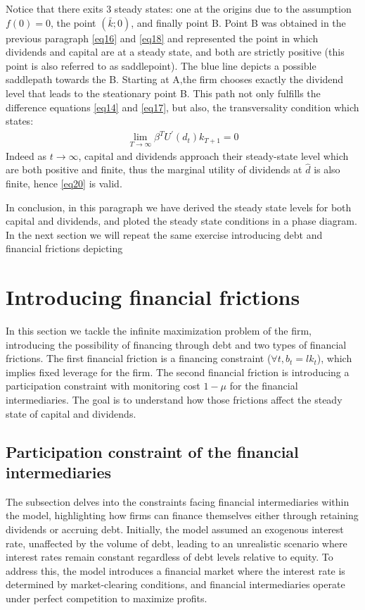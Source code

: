 \documentclass[12pt]{article}
\begin{document}
Notice that there exits 3 steady states: one at the origins due to the assumption \(f(0)=0\), the point \((\bar{k};0)\),
and finally point B. Point B was obtained in the previous paragraph \ref{eq16} and \ref{eq18} and represented the point in
which dividends and capital are at a steady state, and both are strictly positive (this point is also referred to as saddlepoint).
The blue line depicts a possible saddlepath towards the B. Starting at A,the firm chooses exactly the dividend level that
leads to the steationary point B. This path not only fulfills the difference equations \ref{eq14} and \ref{eq17}, but
also, the transversality condition which states:
\begin{align}
    \lim _{T \rightarrow \infty} \beta^T U^{\prime}\left(d_{t}\right) k_{T+1}=0  \label{eq20}
\end{align}
Indeed as \(t \rightarrow \infty\), capital and dividends approach their steady-state level which are both positive and
finite, thus the marginal utility of dividends at \(\hat{d}\) is also finite, hence \ref{eq20} is valid.

In conclusion, in this paragraph we have derived the steady state levels for both capital and dividends, and ploted the
steady state conditions in a phase diagram. In the next section we will repeat the same exercise introducing debt and financial frictions depicting  


\section{Introducing financial frictions}
In this section we tackle the infinite maximization problem of the firm, introducing the possibility of financing through
debt and two types of financial frictions. The first financial friction is a financing constraint (\(\forall t, b_t = l
k_t\)), which implies fixed leverage for the firm. The second financial friction is introducing a participation
constraint with monitoring cost \(1-\mu\) for the financial intermediaries. The goal is to understand how those frictions
affect the steady state of capital and dividends.

\subsection{Participation constraint of the financial intermediaries } 
The subsection delves into the constraints facing financial intermediaries within the model, highlighting how firms can
finance themselves either through retaining dividends or accruing debt. Initially, the model assumed an exogenous
interest rate, unaffected by the volume of debt, leading to an unrealistic scenario where interest rates remain constant
regardless of debt levels relative to equity. To address this, the model introduces a financial market where the
interest rate is determined by market-clearing conditions, and financial intermediaries operate under perfect
competition to maximize profits.
\end{document}
